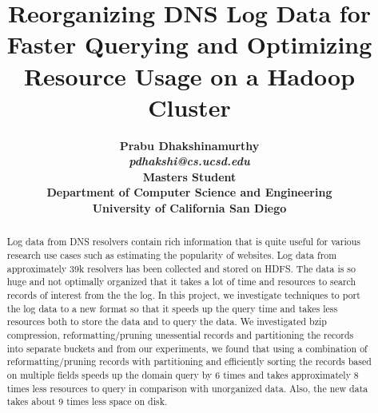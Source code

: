 \documentclass[11pt,a4paper]{article}
\begin{document}
\title{\bf Reorganizing DNS Log Data for Faster Querying and Optimizing Resource Usage on a Hadoop Cluster}
\author{
	\bf Prabu Dhakshinamurthy\\
	\textit{pdhakshi@cs.ucsd.edu}\\
	Masters Student\\
	Department of Computer Science and Engineering\\
	University of California San Diego
}
\date {}
\maketitle

\begin{abstract} 
\noindent
Log data from DNS resolvers contain rich information that is quite useful for various research use cases such as estimating the popularity of websites. Log data from approximately 39k resolvers has been collected and stored on HDFS. The data is so huge and not optimally organized that it takes a lot of time and resources to search records of interest from the the log. In this project, we investigate techniques to port the log data to a new format so that it speeds up the query time and takes less resources both to store the data and to query the data. We investigated bzip compression, reformatting/pruning unessential records and partitioning the records into separate buckets and from our experiments, we found that using a combination of reformatting/pruning records with partitioning and efficiently sorting the records based on multiple fields speeds up the domain query by 6 times and takes approximately 8 times less resources to query in comparison with unorganized data. Also, the new data takes about 9 times less space on disk.
\end{abstract} 
\end{document}
